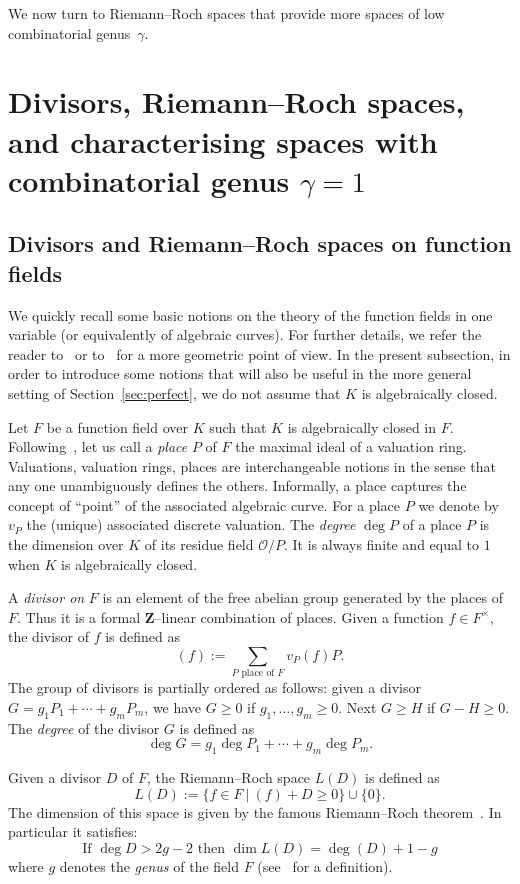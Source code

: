 \documentclass[10pt]{amsart}
\theoremstyle{definition}
\theoremstyle{remark}
\newcommand*\Z{{\mathbf Z}}
\newcommand*\OO{\mathcal{O}}
\renewcommand{\geq}{\geqslant}
\begin{document}
We now turn to Riemann--Roch spaces that provide more spaces of low combinatorial genus~$\gamma$.


\section{Divisors, Riemann--Roch spaces, and characterising spaces with combinatorial genus \texorpdfstring{$\gamma=1$}{gamma=1}}\label{sec:divisors}

\subsection{Divisors and Riemann--Roch spaces on function fields}\label{subsec:divisors}

We quickly recall some basic notions on the theory of the function fields in one variable (or equivalently of algebraic curves). For further details, we refer the reader to~\cite{Stichtenoth} or to~\cite{Fulton} for a more geometric point of view. In the present subsection, in order to introduce some notions that will also be useful in the more general setting of Section~\ref{sec:perfect}, we do not assume that $K$ is algebraically closed.

Let $F$ be a function field over $K$ such that $K$ is algebraically closed in $F$. Following~\cite[Chapter~I]{Stichtenoth}, let us call a \emph{place} $P$ of $F$ the maximal ideal of a valuation ring. Valuations, valuation rings, places are interchangeable notions in the sense that any one unambiguously defines the others. Informally, a place captures the concept of ``point'' of the associated algebraic curve. For a place $P$ we denote by $v_P$ the (unique) associated discrete valuation. The \emph{degree} $\deg P$ of a place $P$ is the dimension over $K$ of its residue field $\OO/P$. It is always finite and equal to $1$ when $K$ is algebraically closed.

A \emph{divisor on} $F$ is an element of the free abelian group generated by the places of $F$. Thus it is a formal $\Z$--linear combination of places. Given a function $f \in F^{\times}$, the divisor of $f$ is defined as
\[
(f):=\sum_{P \textrm{ place of } F} v_P(f)P.
\]
The group of divisors is partially ordered as follows: given a divisor $G= g_1 P_1 + \cdots + g_m P_m$, we have $G\geq0$ if $g_1, \dots, g_m\geq0$. Next $G\geq H$ if $G-H\geq0$. The \emph{degree} of the divisor $G$ is defined as
\[
\deg G= g_1\deg P_1 + \cdots +g_m\deg P_m.
\]

Given a divisor $D$ of $F$, the Riemann--Roch space $L(D)$ is defined as
\[
L(D):=\{ f\in F~|~(f) + D\geq0\} \cup \{0\}.
\]
The dimension of this space is given by the famous Riemann--Roch theorem~\cite[Theorem~1.5.15]{Stichtenoth}. In particular it satisfies:
\begin{equation*}
\text{If } \deg D>2g-2 \text{ then }\dim L(D)=\deg(D)+1-g
\end{equation*}
where $g$ denotes the \emph{genus} of the field $F$ (see~\cite[Definition~1.4.15]{Stichtenoth} for a definition).
\end{document}
